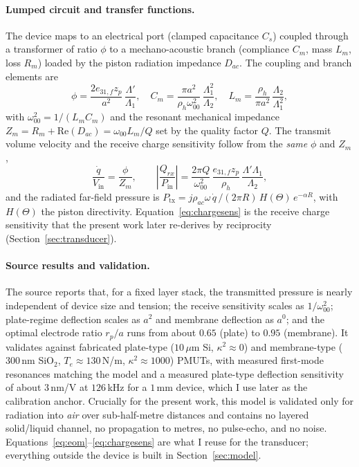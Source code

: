 \documentclass{article}
\begin{document}
\paragraph{Lumped circuit and transfer functions.} The device maps to an electrical port
(clamped capacitance $C_s$) coupled through a transformer of ratio $\phi$ to a mechano-acoustic
branch (compliance $C_m$, mass $L_m$, loss $R_m$) loaded by the piston radiation impedance
$D_{ac}$. The coupling and branch elements are
\begin{equation}
\phi = \frac{2 e_{31,f} z_p}{a^2}\,\frac{\Lambda'}{\Lambda_1},\quad
C_m = \frac{\pi a^2}{\rho_h \omega_{00}^2}\,\frac{\Lambda_1^2}{\Lambda_2},\quad
L_m = \frac{\rho_h}{\pi a^2}\,\frac{\Lambda_2}{\Lambda_1^2},
\label{eq:lumped}
\end{equation}
with $\omega_{00}^2 = 1/(L_m C_m)$ and the resonant mechanical impedance
$Z_m = R_m + \mathrm{Re}(D_{ac}) = \omega_{00} L_m / Q$ set by the quality factor $Q$. The transmit
volume velocity and the receive charge sensitivity follow from the \emph{same} $\phi$ and $Z_m$,
\begin{equation}
\frac{\dot q}{V_{\mathrm{in}}} = \frac{\phi}{Z_m},
\qquad
\left|\frac{Q_{rx}}{P_{\mathrm{in}}}\right|
= \frac{2\pi Q}{\omega_{00}^2}\,\frac{e_{31,f} z_p}{\rho_h}\,\frac{\Lambda'\Lambda_1}{\Lambda_2},
\label{eq:chargesens}
\end{equation}
and the radiated far-field pressure is
$P_{\mathrm{tx}} = j\rho_{ac}\omega\,\dot q\,/(2\pi R)\,H(\Theta)\,e^{-\alpha R}$, with $H(\Theta)$
the piston directivity. Equation~\eqref{eq:chargesens} is the receive charge sensitivity that the
present work later re-derives by reciprocity (Section~\ref{sec:transducer}).

\paragraph{Source results and validation.} The source reports that, for a fixed layer stack, the
transmitted pressure is nearly independent of device size and tension; the receive sensitivity
scales as $1/\omega_{00}^2$; plate-regime deflection scales as $a^2$ and membrane deflection as
$a^0$; and the optimal electrode ratio $r_p/a$ runs from about $0.65$ (plate) to $0.95$
(membrane). It validates against fabricated plate-type ($10\,\mu$m Si, $\kappa^2\!\approx\!0$) and
membrane-type ($300$\,nm SiO$_2$, $T_e\!\approx\!130$\,N/m, $\kappa^2\!\approx\!1000$) PMUTs, with
measured first-mode resonances matching the model and a measured plate-type deflection sensitivity
of about $3$\,nm/V at $126$\,kHz for a $1$\,mm device, which I use later as the calibration anchor.
Crucially for the present work, this model is validated only for radiation into \emph{air} over
sub-half-metre distances and contains no layered solid/liquid channel, no propagation to metres, no
pulse-echo, and no noise. Equations~\eqref{eq:eom}--\eqref{eq:chargesens} are what I reuse for the
transducer; everything outside the device is built in Section~\ref{sec:model}.
\end{document}
